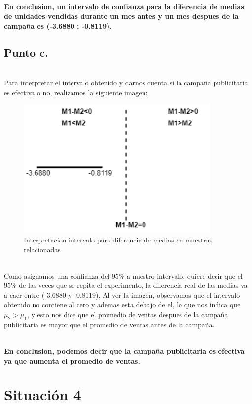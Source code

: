 \documentclass[letterpaper,12pt,onecolumn,titlepage]{article}
\begin{document}
~\\ \textbf{En conclusion, un intervalo de confianza para la diferencia de medias de unidades vendidas durante un mes antes y un mes despues de la campa\~{n}a es (-3.6880 ; -0.8119).}

\pagebreak
\subsection{Punto c.}
~\\ Para interpretar el intervalo obtenido y darnos cuenta si la campa\~{n}a publicitaria es efectiva o no, realizamos la siguiente imagen:
\begin{figure}[!h]
    \begin{center}
        \includegraphics[width=10cm]{Figuras/Grafico3.png}
        \caption{Interpretacion intervalo para diferencia de medias en muestras relacionadas}
        \label{fig:Densidad}
    \end{center}
\end{figure}

~\\ Como asignamos una confianza del $95\%$ a nuestro intervalo, quiere decir que el $95\%$ de las veces que se repita el experimento, la diferencia real de las medias va a caer entre (-3.6880 y -0.8119). Al ver la imagen, observamos que el intervalo obtenido no contiene al cero y ademas esta debajo de el, lo que nos indica que $\mu_2>\mu_1$, y esto nos dice que el promedio de ventas despues de la campa\~{n}a publicitaria es mayor que el promedio de ventas antes de la campa\~{n}a. 

~\\ \textbf{En conclusion, podemos decir que la campa\~{n}a publicitaria es efectiva ya que aumenta el promedio de ventas.}

\pagebreak\section{Situaci\'{o}n 4}
\end{document}
